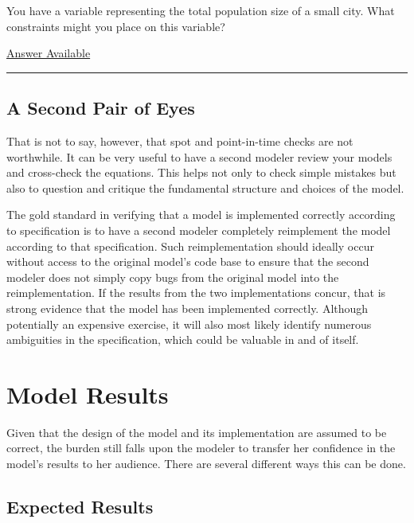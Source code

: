 \documentclass[]{memoir}
\begin{document}

You have a variable representing the total population size of a small
city. What constraints might you place on this variable?

\hyperref[Ans-8-1]{Answer Available}

\begin{center}\rule{3in}{0.4pt}\end{center}

\subsection{A Second Pair of Eyes}

That is not to say, however, that spot and point-in-time checks are not
worthwhile. It can be very useful to have a second modeler review your
models and cross-check the equations. This helps not only to check
simple mistakes but also to question and critique the fundamental
structure and choices of the model.

The gold standard in verifying that a model is implemented correctly
according to specification is to have a second modeler completely
reimplement the model according to that specification. Such
reimplementation should ideally occur without access to the original
model's code base to ensure that the second modeler does not simply copy
bugs from the original model into the reimplementation. If the results
from the two implementations concur, that is strong evidence that the
model has been implemented correctly. Although potentially an expensive
exercise, it will also most likely identify numerous ambiguities in the
specification, which could be valuable in and of itself.

\section{Model Results}

Given that the design of the model and its implementation are assumed to
be correct, the burden still falls upon the modeler to transfer her
confidence in the model's results to her audience. There are several
different ways this can be done.

\subsection{Expected Results}
\end{document}
